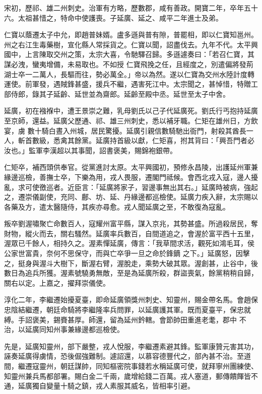 \begin{pinyinscope}
 宋初，歷祁、雄二州刺史。治軍有方略，歷數郡，咸有善政。開寶二年，卒年五十六。太祖甚惜之，特命中使護喪。子延廣、延之、咸平二年進士及弟。



 仁寶以蔭遷太子中允，即趙普妹婿。盧多遜與普有隙，普罷相，即以仁寶知邕州。州之右江生毒藥樹，宣化縣人常採貨之。仁寶以聞，詔盡伐去。九年不代。太平興國中，上言陳取交州之策，太宗大喜，令馳驛召歸。多遜遽奏曰：「若召仁寶，其謀必洩，蠻夷增備，未易取也。不如授
 仁寶飛挽之任，且經度之，別遣偏將發荊湖士卒一二萬人，長驅而往，勢必萬全。」帝以為然。遂以仁寶為交州水陸計度轉運使。前軍發，遇賊鋒甚盛，援兵不繼，遇害死江中。太宗聞之，甚悼惜，特贈工部侍郎，錄其子延齡、延世並為齋郎。延齡至殿中丞。延世至太子中舍。



 延廣，初在襁褓中，遭王景崇之難，乳母劉氏以己子代延廣死。劉氏行丐抱持延廣至京師，還益。延廣父歷通、祁、雄三州刺史，悉以補牙職。仁矩在雄州日，方飲宴，虜
 數十騎白晝入州城，居民驚擾。延廣引親信數騎馳出衙門，射殺其酋長一人，斬首數級，悉禽其餘黨。延廣持首級以獻，仁矩喜，拊其背曰：「興吾門者必汝也。」監軍李漢超以其事聞，詔書褒美，賜錦袍銀帶。



 仁矩卒，補西頭供奉官。從黨進討太原。太平興國初，預修永昌陵，出護延州軍兼緣邊巡檢，善撫士卒，下樂為用，戎人畏服，遷閣門祗候。會西北戎入寇，邊人擾亂，求可使徼巡者。近臣言：「延廣將家子，習邊事無出其右。」延廣時被病，強起
 之，遷崇儀副使，充同、鄜、坊、延、丹緣邊都巡檢使。延廣力疾入辭，太宗賜以各藥及方，遣太醫隨侍，其疾亦尋愈。戎人聞延廣之至，不敢復為寇亂。



 叛卒劉渥嘯聚亡命數百人，寇耀州富平縣，謀入京兆，其勢甚盛。所過殺居民，奪財物，縱火而去，關右騷然。延廣率兵數百，自間道追之，會渥於富平西十五里，渥眾已千餘人，相持久之。渥素憚延廣，傳言：「我草間求活，觀死如鴻毛耳，侯公家世富貴，奈何不思保守，而與亡卒爭一旦之命於鋒鏑
 之下。」延廣怒，因擊之，挺身與渥斗大樹下，斷渥右臂，渥脫走，乘勢大破其眾。渥創甚，止谷中，後數日為追兵所獲。渥素號驍勇無敵，至是為延廣所殺，群盜喪氣，餘黨稍稍自歸，關右以定。上嘉之，擢拜崇儀使。



 淳化二年，李繼遷始擾夏臺，即命延廣領獎州刺史、知靈州，賜金帶名馬。會趙保忠陰結繼遷，朝廷命騎將李繼隆率兵問罪，以延廣護其軍。既而夏臺平，保忠就縛。手詔褒美，錫賚甚厚。師還，留為延州鈐轄。會節帥田重進老耄，郡中
 不治，以延廣同知州事兼緣邊都巡檢使。



 先是，延廣知靈州，部下嚴整，戎人悅服，李繼遷素避其鋒。監軍康贊元害其功，誣奏延廣得虜情，恐後倔強難制。遽詔還，以慕容德豐代之，部內甚不治。至道間，繼遷寇靈州，朝廷謀帥，同知樞密院事錢若水稱延廣可使，就拜寧州團練使、知靈州兼兵馬都部署。賜白金二千兩，歲增給錢二百萬。戎人塞道，郵傳饋餫皆不通，延廣獨自變量十騎之鎮，戎人素服其威名，皆相率引避。




\end{pinyinscope}
